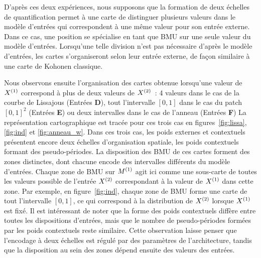 \documentclass[../main]{subfiles}
\begin{document}
D'après ces deux expériences, nous supposons que la formation de deux échelles de quantification permet à une carte de distinguer plusieurs valeurs dans le modèle d'entrées qui correspondent à une même valeur pour son entrée externe. Dans ce cas, une position se spécialise en tant que BMU sur une seule valeur du modèle d'entrées.
Lorsqu'une telle division n'est pas nécessaire d'après le modèle d'entrées, les cartes s'organiseront selon leur entrée externe, de façon similaire à une carte de Kohonen classique.


Nous observons ensuite l'organisation des cartes obtenue lorsqu'une valeur de $X^{({1})}$ correspond à plus de deux valeurs de $X^{({2})}$~: 4 valeurs dans le cas de la courbe de Lissajous (Entrées \textbf{D}), tout l'intervalle $[0,1]$ dans le cas du patch $[0,1]^2$ (Entrées \textbf{E}) ou deux intervalles dans le cas de l'anneau (Entrées \textbf{F})
La représentation cartographique est tracée pour ces trois cas en figures~\ref{fig:lissa}, \ref{fig:ind} et \ref{fig:anneau_w}.
Dans ces trois cas, les poids externes et contextuels présentent encore deux échelles d'organisation spatiale, les poids contextuels formant des pseudo-périodes.
La disposition des BMU de ces cartes forment des zones distinctes, dont chacune encode des intervalles différents du modèle d'entrées. 
Chaque zone de BMU sur $M^{({1})}$ agit ici comme une sous-carte de toutes les valeurs possible de l'entrée $X^{({2})}$ correspondant à la valeur de $X^{({1})}$ dans cette zone.
Par exemple, en figure~\ref{fig:ind}, chaque zone de BMU forme une carte de tout l'intervalle $[0,1]$, ce qui correspond à la distribution de $X^{({2})}$ lorsque $X^{({1})}$ est fixé.
Il est intéressant de noter que la forme des poids contextuels diffère entre toutes les dispositions d'entrées, mais que le nombre de pseudo-périodes formées par les poids contextuels reste similaire. Cette observation laisse penser que l'encodage à deux échelles est régulé par des paramètres de l'architecture, tandis que la disposition au sein des zones dépend ensuite des valeurs des entrées.
\end{document}
